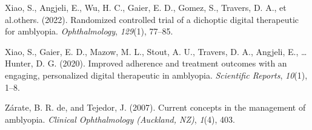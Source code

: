\documentclass[
  onecolumn]{article}
\newlength{\cslhangindent}
\newenvironment{CSLReferences}[2] %
 {%
  \setlength{\parindent}{0pt}
  \ifodd #1 \everypar{\setlength{\hangindent}{\cslhangindent}}\ignorespaces\fi
  \ifnum #2 > 0
  \setlength{\parskip}{#2\baselineskip}
  \fi
 }%
 {}
\begin{document}
\begin{CSLReferences}{1}{0}
\leavevmode{}%
Xiao, S., Angjeli, E., Wu, H. C., Gaier, E. D., Gomez, S., Travers, D.
A., et al.others. (2022). Randomized controlled trial of a dichoptic
digital therapeutic for amblyopia. \emph{Ophthalmology}, \emph{129}(1),
77--85.

\leavevmode{}%
Xiao, S., Gaier, E. D., Mazow, M. L., Stout, A. U., Travers, D. A.,
Angjeli, E., \ldots{} Hunter, D. G. (2020). Improved adherence and
treatment outcomes with an engaging, personalized digital therapeutic in
amblyopia. \emph{Scientific Reports}, \emph{10}(1), 1--8.

\leavevmode{}%
Zárate, B. R. de, and Tejedor, J. (2007). Current concepts in the
management of amblyopia. \emph{Clinical Ophthalmology (Auckland, NZ)},
\emph{1}(4), 403.

\end{CSLReferences}
\end{document}
